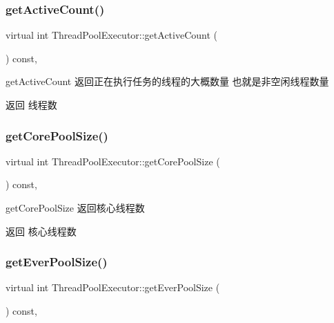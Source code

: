 \subsubsection{\texorpdfstring{get\+Active\+Count()}{getActiveCount()}}
{\footnotesize\ttfamily virtual int Thread\+Pool\+Executor\+::get\+Active\+Count (\begin{DoxyParamCaption}{ }\end{DoxyParamCaption}) const\hspace{0.3cm}{\ttfamily [final]}, {\ttfamily [virtual]}}



get\+Active\+Count 返回正在执行任务的线程的大概数量 也就是非空闲线程数量 

\begin{DoxyReturn}{返回}
线程数 
\end{DoxyReturn}
\mbox{\label{classThreadPoolExecutor_af29377a50af53031bb06aeacf9ef27f7}} 
\subsubsection{\texorpdfstring{get\+Core\+Pool\+Size()}{getCorePoolSize()}}
{\footnotesize\ttfamily virtual int Thread\+Pool\+Executor\+::get\+Core\+Pool\+Size (\begin{DoxyParamCaption}{ }\end{DoxyParamCaption}) const\hspace{0.3cm}{\ttfamily [final]}, {\ttfamily [virtual]}}



get\+Core\+Pool\+Size 返回核心线程数 

\begin{DoxyReturn}{返回}
核心线程数 
\end{DoxyReturn}
\mbox{\label{classThreadPoolExecutor_af630e5117b4f67428a4fcbee5c15a7d9}} 
\subsubsection{\texorpdfstring{get\+Ever\+Pool\+Size()}{getEverPoolSize()}}
{\footnotesize\ttfamily virtual int Thread\+Pool\+Executor\+::get\+Ever\+Pool\+Size (\begin{DoxyParamCaption}{ }\end{DoxyParamCaption}) const\hspace{0.3cm}{\ttfamily [final]}, {\ttfamily [virtual]}}



